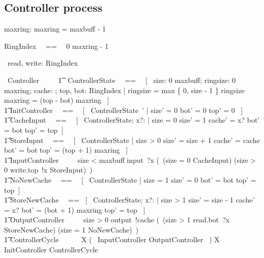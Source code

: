 \documentclass{article}
\begin{document}
\subsection{Controller process}

\begin{axdef}
  maxring: \nat
\where %
  maxring = maxbuff - 1
\end{axdef}

\begin{zed}
    RingIndex ~~==~~ 0 \upto maxring - 1
\end{zed}

\begin{circus}
   \circchannel\ read, write: RingIndex \cross \nat
\end{circus}

\begin{circus}
  \circprocess\ Controller ~~\circdef~~ \circbegin
  \also
    \t1 \circstate\ ControllerState ~~==~~ [~ size: 0 \upto maxbuff; ringsize: 0 \upto maxring; cache: \nat; top, bot: RingIndex | ringsize = max \{ 0, size - 1 \} \land ringsize \mod maxring = (top - bot) \mod maxring ~] \\
    \t1 InitController ~~==~~ [~ ControllerState~' | size' = 0 \land bot' = 0 \land top' = 0 ~] \\
    \t1 CacheInput ~~==~~ [~ \Delta ControllerState; x?: \nat | size = 0 \land size' = 1 \land cache' = x? \land bot' = bot \land top' = top~] \\
    \t1 StoreInput ~~==~~ [~ \Delta ControllerState | size > 0 \land size' = size + 1 \land cache' = cache \land bot' = bot \land top' = (top + 1) \mod maxring ~] \\
    \t1 InputController ~~\circdef~~ \lcircguard size < maxbuff \rcircguard \circguard input~?x \then (~(\lcircguard size = 0 \rcircguard \circguard CacheInput) \extchoice (\lcircguard size > 0 \rcircguard \circguard write.top~!x \then StoreInput)~) \\
    \t1 NoNewCache ~~==~~ [~ \Delta ControllerState | size = 1 \land size' = 0 \land bot' = bot \land top' = top~] \\
    \t1 StoreNewCache ~~==~ [~ \Delta ControllerState; x?: \nat | size > 1 \land size' = size - 1 \land cache' = x? bot' = (bot + 1) \mod maxring \land top' = top ~] \\
    \t1 OutputController ~~\circdef~~ \lcircguard size > 0 \rcircguard \circguard output~!cache \then (~(\lcircguard size > 1 \rcircguard \circguard read.bot~?x \then StoreNewCache) \extchoice (\lcircguard size = 1 \rcircguard \circguard NoNewCache)~) \\
    \t1 ControllerCycle ~~\circdef~~ \circmu\ X \circspot (~ InputController \extchoice OutputController ~) \circseq X
  \also %
   \circspot InitController \circseq ControllerCycle \\
  \circend
\end{circus}
\end{document}
